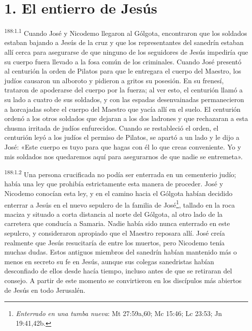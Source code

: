 \section*{1. El entierro de Jesús}
\par
\textsuperscript{188:1.1} Cuando José y Nicodemo llegaron al Gólgota, encontraron que los soldados estaban bajando a Jesús de la cruz y que los representantes del sanedrín estaban allí cerca para asegurarse de que ninguno de los seguidores de Jesús impediría que su cuerpo fuera llevado a la fosa común de los criminales. Cuando José presentó al centurión la orden de Pilatos para que le entregara el cuerpo del Maestro, los judíos causaron un alboroto y pidieron a gritos su posesión. En su frenesí, trataron de apoderarse del cuerpo por la fuerza; al ver esto, el centurión llamó a su lado a cuatro de sus soldados, y con las espadas desenvainadas permanecieron a horcajadas sobre el cuerpo del Maestro que yacía allí en el suelo. El centurión ordenó a los otros soldados que dejaran a los dos ladrones y que rechazaran a esta chusma irritada de judíos enfurecidos. Cuando se restableció el orden, el centurión leyó a los judíos el permiso de Pilatos, se apartó a un lado y le dijo a José: «Este cuerpo es tuyo para que hagas con él lo que creas conveniente. Yo y mis soldados nos quedaremos aquí para asegurarnos de que nadie se entremeta».

\par
\textsuperscript{188:1.2} Una persona crucificada no podía ser enterrada en un cementerio judío; había una ley que prohibía estrictamente esta manera de proceder. José y Nicodemo conocían esta ley, y en el camino hacia el Gólgota habían decidido enterrar a Jesús en el nuevo sepulcro de la familia de José\footnote{\textit{Enterrado en una tumba nueva}: Mt 27:59a,60; Mc 15:46; Lc 23:53; Jn 19:41,42b.}, tallado en la roca maciza y situado a corta distancia al norte del Gólgota, al otro lado de la carretera que conducía a Samaria. Nadie había sido nunca enterrado en este sepulcro, y consideraron apropiado que el Maestro reposara allí. José creía realmente que Jesús resucitaría de entre los muertos, pero Nicodemo tenía muchas dudas. Estos antiguos miembros del sanedrín habían mantenido más o menos en secreto su fe en Jesús, aunque sus colegas sanedristas habían desconfiado de ellos desde hacía tiempo, incluso antes de que se retiraran del consejo. A partir de este momento se convirtieron en los discípulos más abiertos de Jesús en todo Jerusalén.

